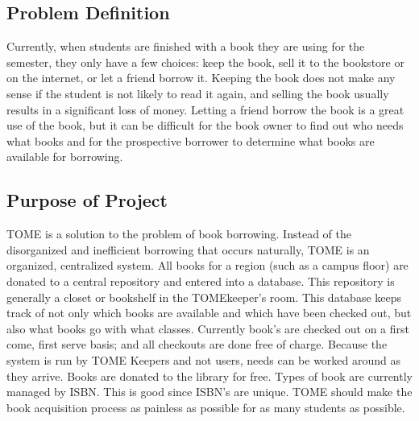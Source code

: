\documentclass[12pt,titlepage]{article}
\begin{document}
\subsection{Problem Definition}
Currently, when students are finished with a book they are using for the semester, they only have a few choices: keep the book, sell it to the bookstore or on the internet, or let a friend borrow it.  Keeping the book does not make any sense if the student is not likely to read it again, and selling the book usually results in a significant loss of money.  Letting a friend borrow the book is a great use of the book, but it can be difficult for the book owner to find out who needs what books and for the prospective borrower to determine what books are available for borrowing.
\subsection{Purpose of Project}
TOME is a solution to the problem of book borrowing.  Instead of the disorganized and inefficient borrowing that occurs naturally, TOME is an organized, centralized system.  All books for a region (such as a campus floor) are donated to a central repository and entered into a database.  This repository is generally a closet or bookshelf in the TOMEkeeper's room.  This database keeps track of not only which books are available and which have been checked out, but also what books go with what classes.  Currently book's are checked out on a first come, first serve basis; and all checkouts are done free of charge.  Because the system is run by TOME Keepers and not users, needs can be worked around as they arrive.  Books are donated to the library for free.  Types of book are currently managed by ISBN.  This is good since ISBN's are unique.  TOME should make the book acquisition process as painless as possible for as many students as possible.
\end{document}
